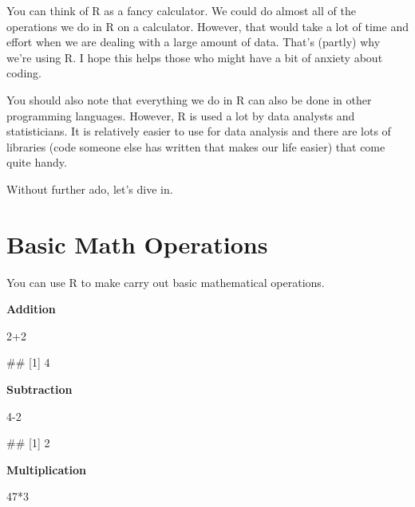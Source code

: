 \documentclass[
]{book}
\newenvironment{Shaded}{\begin{snugshade}}{\end{snugshade}}
\newcommand{\DecValTok}[1]{\textcolor[rgb]{0.00,0.00,0.81}{#1}}
\newcommand{\NormalTok}[1]{#1}
\newcommand{\SpecialCharTok}[1]{\textcolor[rgb]{0.00,0.00,0.00}{#1}}
\begin{document}
You can think of R as a fancy calculator. We could do almost all of the operations we do in R on a calculator. However, that would take a lot of time and effort when we are dealing with a large amount of data. That's (partly) why we're using R. I hope this helps those who might have a bit of anxiety about coding.

You should also note that everything we do in R can also be done in other programming languages. However, R is used a lot by data analysts and statisticians. It is relatively easier to use for data analysis and there are lots of libraries (code someone else has written that makes our life easier) that come quite handy.

Without further ado, let's dive in.

\hypertarget{basic-math-operations}{%
\section{Basic Math Operations}\label{basic-math-operations}}

You can use R to make carry out basic mathematical operations.

\textbf{Addition}

\begin{Shaded}
\begin{Highlighting}[]
\DecValTok{2}\SpecialCharTok{+}\DecValTok{2}
\end{Highlighting}
\end{Shaded}

\begin{Shaded}
\begin{Highlighting}[]
\NormalTok{\#\# [1] 4}
\end{Highlighting}
\end{Shaded}

\textbf{Subtraction}

\begin{Shaded}
\begin{Highlighting}[]
\DecValTok{4{-}2}
\end{Highlighting}
\end{Shaded}

\begin{Shaded}
\begin{Highlighting}[]
\NormalTok{\#\# [1] 2}
\end{Highlighting}
\end{Shaded}

\textbf{Multiplication}

\begin{Shaded}
\begin{Highlighting}[]
\DecValTok{47}\SpecialCharTok{*}\DecValTok{3}
\end{Highlighting}
\end{Shaded}
\end{document}

